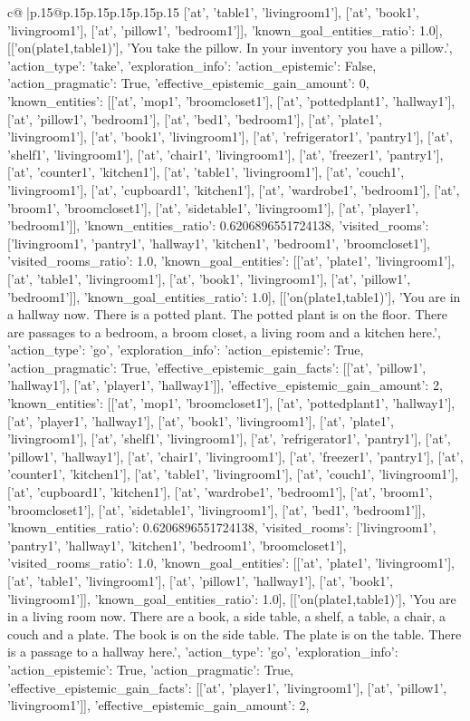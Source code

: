 \documentclass{article}
\begin{document}
{\begin{supertabular}{c@{$\;$}|p{.15\linewidth}@{}p{.15\linewidth}p{.15\linewidth}p{.15\linewidth}p{.15\linewidth}p{.15\linewidth}}
{{{['at', 'table1', 'livingroom1'], ['at', 'book1', 'livingroom1'], ['at', 'pillow1', 'bedroom1']], 'known_goal_entities_ratio': 1.0}}], [['on(plate1,table1)'], 'You take the pillow. In your inventory you have a pillow.', {'action_type': 'take', 'exploration_info': {'action_epistemic': False, 'action_pragmatic': True, 'effective_epistemic_gain_amount': 0, 'known_entities': [['at', 'mop1', 'broomcloset1'], ['at', 'pottedplant1', 'hallway1'], ['at', 'pillow1', 'bedroom1'], ['at', 'bed1', 'bedroom1'], ['at', 'plate1', 'livingroom1'], ['at', 'book1', 'livingroom1'], ['at', 'refrigerator1', 'pantry1'], ['at', 'shelf1', 'livingroom1'], ['at', 'chair1', 'livingroom1'], ['at', 'freezer1', 'pantry1'], ['at', 'counter1', 'kitchen1'], ['at', 'table1', 'livingroom1'], ['at', 'couch1', 'livingroom1'], ['at', 'cupboard1', 'kitchen1'], ['at', 'wardrobe1', 'bedroom1'], ['at', 'broom1', 'broomcloset1'], ['at', 'sidetable1', 'livingroom1'], ['at', 'player1', 'bedroom1']], 'known_entities_ratio': 0.6206896551724138, 'visited_rooms': ['livingroom1', 'pantry1', 'hallway1', 'kitchen1', 'bedroom1', 'broomcloset1'], 'visited_rooms_ratio': 1.0, 'known_goal_entities': [['at', 'plate1', 'livingroom1'], ['at', 'table1', 'livingroom1'], ['at', 'book1', 'livingroom1'], ['at', 'pillow1', 'bedroom1']], 'known_goal_entities_ratio': 1.0}}], [['on(plate1,table1)'], 'You are in a hallway now. There is a potted plant. The potted plant is on the floor. There are passages to a bedroom, a broom closet, a living room and a kitchen here.', {'action_type': 'go', 'exploration_info': {'action_epistemic': True, 'action_pragmatic': True, 'effective_epistemic_gain_facts': [['at', 'pillow1', 'hallway1'], ['at', 'player1', 'hallway1']], 'effective_epistemic_gain_amount': 2, 'known_entities': [['at', 'mop1', 'broomcloset1'], ['at', 'pottedplant1', 'hallway1'], ['at', 'player1', 'hallway1'], ['at', 'book1', 'livingroom1'], ['at', 'plate1', 'livingroom1'], ['at', 'shelf1', 'livingroom1'], ['at', 'refrigerator1', 'pantry1'], ['at', 'pillow1', 'hallway1'], ['at', 'chair1', 'livingroom1'], ['at', 'freezer1', 'pantry1'], ['at', 'counter1', 'kitchen1'], ['at', 'table1', 'livingroom1'], ['at', 'couch1', 'livingroom1'], ['at', 'cupboard1', 'kitchen1'], ['at', 'wardrobe1', 'bedroom1'], ['at', 'broom1', 'broomcloset1'], ['at', 'sidetable1', 'livingroom1'], ['at', 'bed1', 'bedroom1']], 'known_entities_ratio': 0.6206896551724138, 'visited_rooms': ['livingroom1', 'pantry1', 'hallway1', 'kitchen1', 'bedroom1', 'broomcloset1'], 'visited_rooms_ratio': 1.0, 'known_goal_entities': [['at', 'plate1', 'livingroom1'], ['at', 'table1', 'livingroom1'], ['at', 'pillow1', 'hallway1'], ['at', 'book1', 'livingroom1']], 'known_goal_entities_ratio': 1.0}}], [['on(plate1,table1)'], 'You are in a living room now. There are a book, a side table, a shelf, a table, a chair, a couch and a plate. The book is on the side table. The plate is on the table. There is a passage to a hallway here.', {'action_type': 'go', 'exploration_info': {'action_epistemic': True, 'action_pragmatic': True, 'effective_epistemic_gain_facts': [['at', 'player1', 'livingroom1'], ['at', 'pillow1', 'livingroom1']], 'effective_epistemic_gain_amount': 2, }}}
\end{supertabular}}
\end{document}
